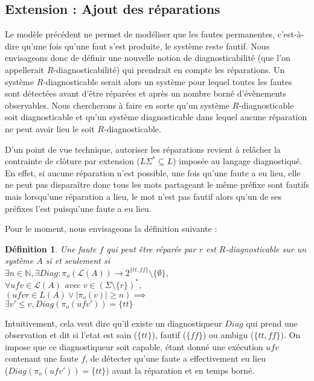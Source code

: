 \documentclass[a4paper,10pt]{article}
\newtheorem{mydef}{D\'efinition}
\begin{document}
\subsection{Extension : Ajout des r\'eparations}

Le mod\`ele pr\'ec\'edent ne permet de mod\'eliser que les fautes permanentes, c'est-\`a-dire qu'une fois qu'une faut s'est produite, le syst\`eme reste fautif. Nous envisageons donc de d\'efinir une nouvelle notion de diagnosticabilit\'e (que l'on appellerait $R$-diagnosticabilit\'e) qui prendrait en compte les r\'eparations. Un syst\`eme $R$-diagnosticable serait alors un syst\`eme pour lequel toutes les fautes sont d\'etect\'ees avant d'\^etre r\'epar\'ees et apr\`es un nombre born\'e d'\'ev\`enements observables. Nous chercherons \`a faire en sorte qu'un syst\`eme $R$-diagnosticable soit diagnosticable et qu'un syst\`eme diagnosticable dans lequel aucune r\'eparation ne peut avoir lieu le soit $R$-diagnosticable.

D'un point de vue technique, autoriser les r\'eparations revient \`a rel\^acher la contrainte de cl\^oture par extension ($L\Sigma^*\subseteq L$) impos\'ee au langage diagnostiqu\'e. En effet, si aucune r\'eparation n'est possible, une fois qu'une faute a eu lieu, elle ne peut pas dispara\^itre donc tous les mots partageant le m\^eme pr\'efixe sont fautifs mais lorsqu'une r\'eparation a lieu, le mot n'est pas fautif alors qu'un de ses pr\'efixes l'est puisqu'une faute a eu lieu.

Pour le moment, nous envisageons la d\'efinition suivante :

\begin{mydef}
  Une faute $f$ qui peut \^etre r\'epar\'ee par $r$ est $R$-diagnosticable sur un syst\`eme $A$ si et seulement si\\
  $\exists n \in \mathbb N,\exists Diag : \pi_o(\mathcal L(A)) \to 2^{\{tt, ff\}}\setminus \{\emptyset\}$,\\
  $\forall ufv\in \mathcal L(A)$ avec $v\in \left(\Sigma\setminus \{r\}\right)^*$,\\
  $\left(ufvr \in L(A) \lor |\pi_o(v)| \ge n\right) \implies$\\
  $\exists v'\le v, Diag(\pi_o(ufv'))=\{tt\}$
\end{mydef}

Intuitivement, cela veut dire qu'il existe un diagnostiqueur $Diag$ qui prend une observation et dit si l'etat est sain ($\{tt\}$), fautif ($\{ff\}$) ou ambigu ($\{tt, ff\}$). On impose que ce diagnostiqueur soit capable, \'etant donn\'e une ex\'ecution $ufv$ contenant une faute $f$, de d\'etecter qu'une faute a effectivement eu lieu\\ ($Diag(\pi_o(ufv'))=\{tt\}$) avant la r\'eparation et en temps born\'e.
\end{document}
